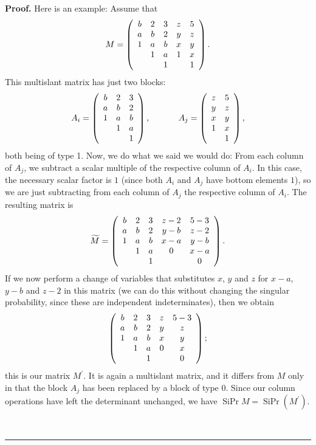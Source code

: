\documentclass[numbers=enddot,12pt,final,onecolumn,notitlepage]{scrartcl}%
\theoremstyle{definition}
\newenvironment{proof}[1][Proof]{\noindent\textbf{#1.} }{\ \rule{0.5em}{0.5em}}
\theoremstyle{plainsl}
\begin{document}
\begin{proof}
Here is an example: Assume that
\[
M=\left(
\begin{array}
[c]{ccccc}%
b & 2 & 3 & z & 5\\
a & b & 2 & y & z\\
1 & a & b & x & y\\
& 1 & a & 1 & x\\
&  & 1 &  & 1
\end{array}
\right)  .
\]
This multislant matrix has just two blocks:
\[
A_{i}=\left(
\begin{array}
[c]{ccc}%
b & 2 & 3\\
a & b & 2\\
1 & a & b\\
& 1 & a\\
&  & 1
\end{array}
\right)  ,\ \ \ \ \ \ \ \ \ \ A_{j}=\left(
\begin{array}
[c]{cc}%
z & 5\\
y & z\\
x & y\\
1 & x\\
& 1
\end{array}
\right)  ,
\]
both being of type 1. Now, we do what we said we would do: From each column of
$A_{j}$, we subtract a scalar multiple of the respective column of $A_{i}$. In
this case, the necessary scalar factor is $1$ (since both $A_{i}$ and $A_{j}$
have bottom elements $1$), so we are just subtracting from each column of
$A_{j}$ the respective column of $A_{i}$. The resulting matrix is%
\[
\widetilde{M}=\left(
\begin{array}
[c]{ccccc}%
b & 2 & 3 & z-2 & 5-3\\
a & b & 2 & y-b & z-2\\
1 & a & b & x-a & y-b\\
& 1 & a & 0 & x-a\\
&  & 1 &  & 0
\end{array}
\right)  .
\]
If we now perform a change of variables that substitutes $x$, $y$ and $z$ for
$x-a$, $y-b$ and $z-2$ in this matrix (we can do this without changing the
singular probability, since these are independent indeterminates), then we
obtain%
\[
\left(
\begin{array}
[c]{ccccc}%
b & 2 & 3 & z & 5-3\\
a & b & 2 & y & z\\
1 & a & b & x & y\\
& 1 & a & 0 & x\\
&  & 1 &  & 0
\end{array}
\right)  ;
\]
this is our matrix $M^{\prime}$. It is again a multislant matrix, and it
differs from $M$ only in that the block $A_{j}$ has been replaced by a block
of type 0. Since our column operations have left the determinant unchanged, we
have $\operatorname*{SiPr}M=\operatorname*{SiPr}\left(  M^{\prime}\right)  $.


\end{proof}
\end{document}
